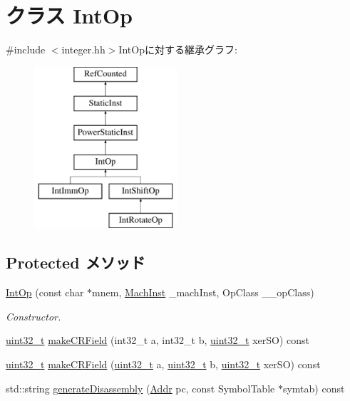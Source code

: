 \hypertarget{classPowerISA_1_1IntOp}{
\section{クラス IntOp}
\label{classPowerISA_1_1IntOp}
}


{\ttfamily \#include $<$integer.hh$>$}IntOpに対する継承グラフ:\begin{figure}[H]
\begin{center}
\leavevmode
\includegraphics[height=6cm]{classPowerISA_1_1IntOp}
\end{center}
\end{figure}
\subsection*{Protected メソッド}
\begin{DoxyCompactItemize}
\item 
\hyperlink{classPowerISA_1_1IntOp_a717c06097161d221442d17dca50982db}{IntOp} (const char $\ast$mnem, \hyperlink{namespacePowerISA_a301c22ea09fa33dcfe6ddf22f203699c}{MachInst} \_\-machInst, OpClass \_\-\_\-opClass)
\begin{DoxyCompactList}\small\item\em Constructor. \item\end{DoxyCompactList}\item 
\hyperlink{Type_8hh_a435d1572bf3f880d55459d9805097f62}{uint32\_\-t} \hyperlink{classPowerISA_1_1IntOp_a267e3f812faf502efbbd47f88ee1737a}{makeCRField} (int32\_\-t a, int32\_\-t b, \hyperlink{Type_8hh_a435d1572bf3f880d55459d9805097f62}{uint32\_\-t} xerSO) const 
\item 
\hyperlink{Type_8hh_a435d1572bf3f880d55459d9805097f62}{uint32\_\-t} \hyperlink{classPowerISA_1_1IntOp_a10abff1d629ec03bbdffbe7eb03c1b77}{makeCRField} (\hyperlink{Type_8hh_a435d1572bf3f880d55459d9805097f62}{uint32\_\-t} a, \hyperlink{Type_8hh_a435d1572bf3f880d55459d9805097f62}{uint32\_\-t} b, \hyperlink{Type_8hh_a435d1572bf3f880d55459d9805097f62}{uint32\_\-t} xerSO) const 
\item 
std::string \hyperlink{classPowerISA_1_1IntOp_a3134956ec18bb095818e06eb988f6c55}{generateDisassembly} (\hyperlink{base_2types_8hh_af1bb03d6a4ee096394a6749f0a169232}{Addr} pc, const SymbolTable $\ast$symtab) const 
\end{DoxyCompactItemize}
